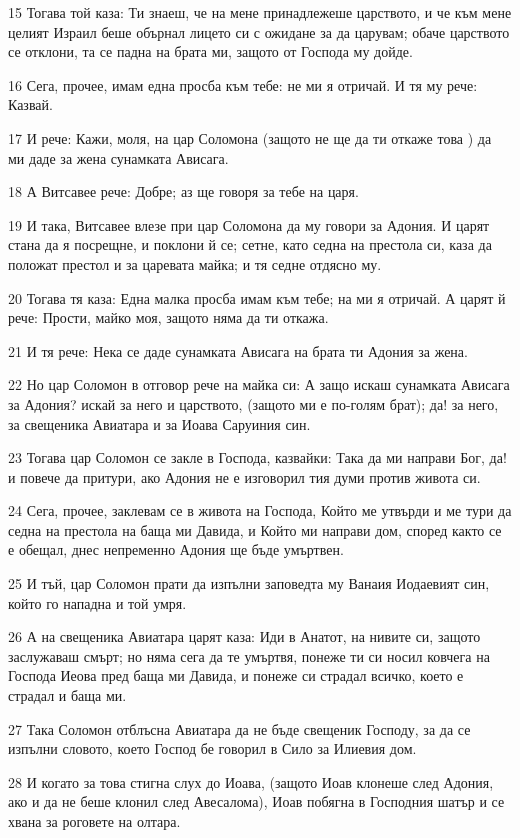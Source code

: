 \par 15 Тогава той каза: Ти знаеш, че на мене принадлежеше царството, и че към мене целият Израил беше обърнал лицето си с ожидане за да царувам; обаче царството се отклони, та се падна на брата ми, защото от Господа му дойде.
\par 16 Сега, прочее, имам една просба към тебе: не ми я отричай. И тя му рече: Казвай.
\par 17 И рече: Кажи, моля, на цар Соломона (защото не ще да ти откаже това ) да ми даде за жена сунамката Ависага.
\par 18 А Витсавее рече: Добре; аз ще говоря за тебе на царя.
\par 19 И така, Витсавее влезе при цар Соломона да му говори за Адония. И царят стана да я посрещне, и поклони й се; сетне, като седна на престола си, каза да положат престол и за царевата майка; и тя седне отдясно му.
\par 20 Тогава тя каза: Една малка просба имам към тебе; на ми я отричай. А царят й рече: Прости, майко моя, защото няма да ти откажа.
\par 21 И тя рече: Нека се даде сунамката Ависага на брата ти Адония за жена.
\par 22 Но цар Соломон в отговор рече на майка си: А защо искаш сунамката Ависага за Адония? искай за него и царството, (защото ми е по-голям брат); да! за него, за свещеника Авиатара и за Иоава Саруиния син.
\par 23 Тогава цар Соломон се закле в Господа, казвайки: Така да ми направи Бог, да! и повече да притури, ако Адония не е изговорил тия думи против живота си.
\par 24 Сега, прочее, заклевам се в живота на Господа, Който ме утвърди и ме тури да седна на престола на баща ми Давида, и Който ми направи дом, според както се е обещал, днес непременно Адония ще бъде умъртвен.
\par 25 И тъй, цар Соломон прати да изпълни заповедта му Ванаия Иодаевият син, който го нападна и той умря.
\par 26 А на свещеника Авиатара царят каза: Иди в Анатот, на нивите си, защото заслужаваш смърт; но няма сега да те умъртвя, понеже ти си носил ковчега на Господа Иеова пред баща ми Давида, и понеже си страдал всичко, което е страдал и баща ми.
\par 27 Така Соломон отблъсна Авиатара да не бъде свещеник Господу, за да се изпълни словото, което Господ бе говорил в Сило за Илиевия дом.
\par 28 И когато за това стигна слух до Иоава, (защото Иоав клонеше след Адония, ако и да не беше клонил след Авесалома), Иоав побягна в Господния шатър и се хвана за роговете на олтара.
